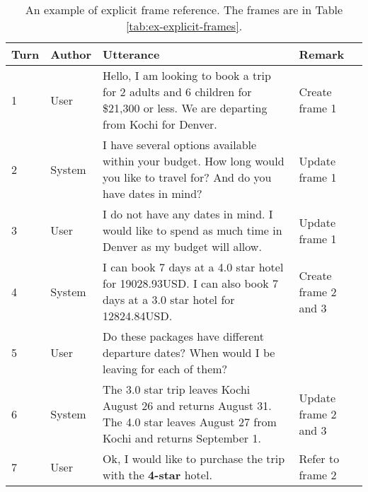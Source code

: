 
\begin{table}
    \centering
    \caption[Explicit frame reference]{An example of explicit frame reference. The frames are in Table \ref{tab:ex-explicit-frames}.}
    \label{tab:ex-explicit}
    \begin{tabularx}{\textwidth}{llX|l}
        \toprule
        Turn & Author & Utterance & Remark \\
        \midrule
        1 & User & Hello, I am looking to book a trip for 2 adults and 6 children for \$21,300 or less. We are departing from Kochi for Denver. & Create frame 1 \\
        2 & System & I have several options available within your budget. How long would you like to travel for? And do you have dates in mind? & Update frame 1 \\
        3 & User & I do not have any dates in mind. I would like to spend as much time in Denver as my budget will allow. & Update frame 1 \\
        4 & System & I can book 7 days at a 4.0 star hotel for 19028.93USD. I can also book 7 days at a 3.0 star hotel for 12824.84USD. & Create frame 2 and 3 \\
        5 & User & Do these packages have different departure dates? When would I be leaving for each of them? & \\
        6 & System & The 3.0 star trip leaves Kochi August 26 and returns August 31. The 4.0 star leaves August 27 from Kochi and returns September 1. & Update frame 2 and 3 \\
        7 & User & Ok, I would like to purchase the trip with the \textbf{4-star} hotel. & Refer to frame 2 \\
        \bottomrule
    \end{tabularx}
\end{table}

